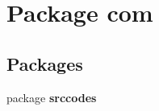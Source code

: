 \section{Package com}
\label{namespacecom}
\subsection*{Packages}
\begin{DoxyCompactItemize}
\item 
package {\bf srccodes}
\end{DoxyCompactItemize}
